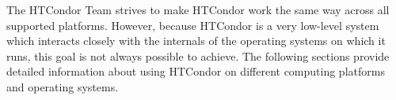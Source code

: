 The HTCondor Team strives to make HTCondor work the same way across all
supported platforms.
However, because HTCondor is a very low-level system which interacts
closely with the internals of the operating systems on which it runs,
this goal is not always possible to achieve.
The following sections provide detailed information about using HTCondor
on different computing platforms and operating systems.




